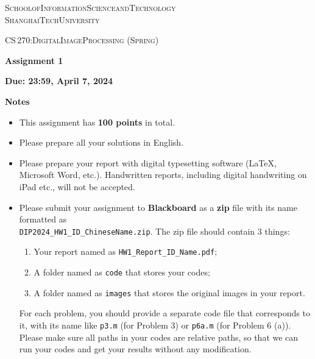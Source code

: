 \documentclass[A4paper, 11pt]{article}
\newcommand{\<}{\,\langle\,}
\renewcommand{\>}{\,\rangle}
\newcommand{\0}{\mathbf{0}}
\newcommand{\1}{\mathbf{1}}
\newcommand{\typeset}{
    \setlength{\parindent}{0pt}
    \setlength{\parskip}{1ex}
    \setlength{\abovedisplayskip}{1ex}
    \setlength{\belowdisplayskip}{1ex}
}
\begin{document}
\begin{spacing}{1.3}

\typeset

\textsc{\large{School\;of\;Information\;Science\;and\;Technology\\[2pt] ShanghaiTech\;University}}

\vspace*{5ex}

\textsc{\large{CS\,270:\;Digital\;Image\;Processing (Spring)}}

\vspace*{2.5ex} \textbf{\huge{Assignment 1}}

\vspace*{1.5ex} \textbf{\large{Due: 23:59, April 7, 2024}}

\vspace*{5ex}

\textbf{\large{Notes}}

\begin{itemize} \setlength{\parskip}{0.5ex} \vspace*{-1ex} 
    \item This assignment has \textbf{100 points} in total.
    \item Please prepare all your solutions in English.
    \item Please prepare your report with digital typesetting software (LaTeX, Microsoft Word, etc.). Handwritten reports, including digital handwriting on iPad etc., will not be accepted.
    \item Please submit your assignment to \textbf{Blackboard} as a \textbf{zip} file with its name formatted as\\ \texttt{DIP2024\_HW1\_ID\_ChineseName.zip}. The zip file should contain 3 things:
    \begin{enumerate}
        \item Your report named as \texttt{HW1\_Report\_ID\_Name.pdf};
        \item A folder named as \texttt{code} that stores your codes;
        \item A folder named as \texttt{images} that stores the original images in your report.
    \end{enumerate}
    For each problem, you should provide a separate code file that corresponds to it, with its name like \texttt{p3.m} (for Problem 3) or \texttt{p6a.m} (for Problem 6 (a)). Please make sure all paths in your codes are relative paths, so that we can run your codes and get your results without any modification.
\end{itemize}


\end{spacing}
\end{document}
